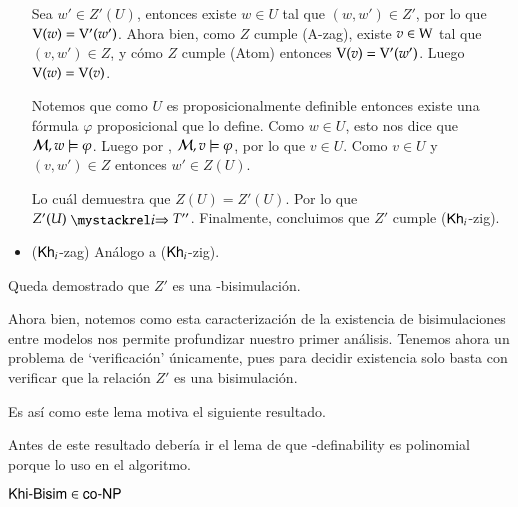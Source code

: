 \begin{demostracion}
\begin{itemize}
        Sea $w' \in Z'(U)$, entonces existe $w \in U$ tal que $(w,w') \in Z'$, por lo que $\mathrm{V}(w) = \mathrm{V}'(w')$. 
        Ahora bien, como $Z$ cumple (A-zag), existe $v \in \mathrm{W}$ tal que $(v,w') \in Z$, y cómo $Z$ cumple 
        (Atom) entonces $\mathrm{V}(v) = \mathrm{V}'(w')$. Luego $\mathrm{V}(w) = \mathrm{V}(v)$.
    
        Notemos que como $U$ es proposicionalmente definible entonces existe una fórmula $\varphi$ 
        proposicional que lo define. Como $w \in U$, esto nos dice que $\mathcal{M}, w \models \varphi$. 
        Luego por , $\mathcal{M}, v \models \varphi$, por lo que $v \in U$. Como $v \in U$ y $(v,w') \in Z$ 
        entonces $w' \in Z(U)$.
    
        Lo cuál demuestra que $Z(U) = Z'(U)$. Por lo que $Z'(U) \ultsExecAgi T''$. Finalmente, concluimos 
        que $Z'$ cumple ($\mathsf{Kh}_i$-zig).
    
    
        \item ($\mathsf{Kh}_i$-zag) Análogo a ($\mathsf{Kh}_i$-zig).
    \end{itemize}
    
    Queda demostrado que $Z'$ es una \KHilogic-bisimulación.
\end{demostracion}

Ahora bien, notemos como esta caracterización de la existencia de bisimulaciones entre modelos
nos permite profundizar nuestro primer análisis. Tenemos ahora un problema de `verificación'
únicamente, pues para decidir existencia solo basta con verificar que la relación $Z'$ es una bisimulación.

Es así como este lema motiva el siguiente resultado. 

Antes de este resultado debería ir el lema de que \KHilogic-definability es polinomial porque lo uso en el algoritmo. 


\begin{lema}
    $\rm\textsf{Khi-Bisim} \in \rm\textsf{co-NP}$ 
\end{lema}

